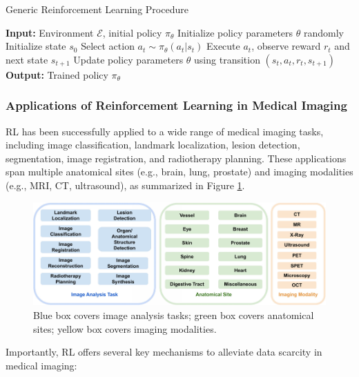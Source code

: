 \documentclass{article}
\begin{document}
\begin{algorithm}[H]
    \caption{Generic Reinforcement Learning Procedure}
    \label{alg:rl_procedure}
    \begin{algorithmic}[1]
    \STATE \textbf{Input:} Environment $\mathcal{E}$, initial policy $\pi_\theta$
    \STATE Initialize policy parameters $\theta$ randomly
        \STATE Initialize state $s_0$
            \STATE Select action $a_t \sim \pi_\theta(a_t|s_t)$
            \STATE Execute $a_t$, observe reward $r_t$ and next state $s_{t+1}$
            \STATE Update policy parameters $\theta$ using transition $(s_t, a_t, r_t, s_{t+1})$
        \ENDFOR
    \ENDFOR
    \STATE \textbf{Output:} Trained policy $\pi_\theta$
    \end{algorithmic}
\end{algorithm}

\subsubsection{Applications of Reinforcement Learning in Medical Imaging}

RL has been successfully applied to a wide range of medical imaging tasks, including image classification, landmark localization, lesion detection, segmentation, image registration, and radiotherapy planning. These applications span multiple anatomical sites (e.g., brain, lung, prostate) and imaging modalities (e.g., MRI, CT, ultrasound), as summarized in Figure \ref{fig:applications_of_rl_in_medical_imaging}.

\begin{figure}[htb]
    \centering
    \includegraphics[width=0.98\linewidth]{images/Blue.pdf}
    \caption{Blue box covers image analysis tasks; green box covers anatomical sites; yellow box covers imaging modalities.}
    \label{fig:applications_of_rl_in_medical_imaging}
\end{figure}


Importantly, RL offers several key mechanisms to alleviate data scarcity in medical imaging:
\end{document}
